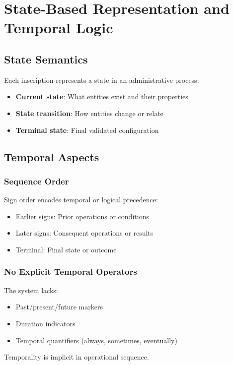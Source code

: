 \section{State-Based Representation and Temporal Logic}

\subsection{State Semantics}

Each inscription represents a state in an administrative process:
\begin{itemize}
    \item \textbf{Current state}: What entities exist and their properties
    \item \textbf{State transition}: How entities change or relate
    \item \textbf{Terminal state}: Final validated configuration
\end{itemize}

\subsection{Temporal Aspects}

\subsubsection{Sequence Order}
Sign order encodes temporal or logical precedence:
\begin{itemize}
    \item Earlier signs: Prior operations or conditions
    \item Later signs: Consequent operations or results
    \item Terminal: Final state or outcome
\end{itemize}

\subsubsection{No Explicit Temporal Operators}
The system lacks:
\begin{itemize}
    \item Past/present/future markers
    \item Duration indicators
    \item Temporal quantifiers (always, sometimes, eventually)
\end{itemize}

Temporality is implicit in operational sequence.

